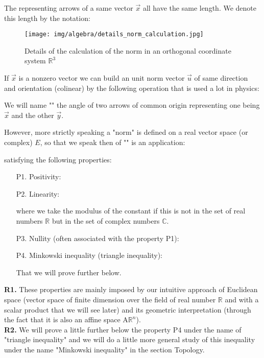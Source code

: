 	The representing arrows of a same vector $\vec{x}$ all have the same length. We denote this length by the notation:
	
	\begin{figure}[H]
		\centering
		\texttt{[image: img/algebra/details\_norm\_calculation.jpg]}
		\caption{Details of the calculation of the norm in an orthogonal coordinate system $\mathbb{R}^3$}
	\end{figure}
	If $\vec{x}$ is a nonzero vector we can build an unit norm vector $\vec{u}$ of same direction and orientation (colinear) by the following operation that is used a lot in physics:
	
	We will name "" the angle of two arrows of common origin representing one being $\vec{x}$ and the other $\vec{y}$.
	
	However, more strictly speaking a "norm" is defined on a real vector space (or complex) $E$, so that we speak then of "" is an application:
	
	satisfying the following properties:
	\begin{enumerate}
		\item[P1.] Positivity:
		
		\item[P2.] Linearity:
		
		where we take the modulus of the constant if this is not in the set of real numbers $\mathbb{R}$ but in the set of complex numbers $\mathbb{C}$.
		\item[P3.] Nullity (often associated with the property P1):
		
		\item[P4.] Minkowski inequality (triangle inequality):
		
		That we will prove further below.
	\end{enumerate}
	\begin{tcolorbox}[title=Remark,colframe=black,arc=10pt]
	\textbf{R1.} These properties are mainly imposed by our intuitive approach of Euclidean space (vector space of finite dimension over the field of real number $\mathbb{R}$ and with a scalar product that we will see later) and its geometric interpretation (through the fact that it is also an affine space $\text{A}\mathbb{R}^n$).\\
	
	\textbf{R2.} We will prove a little further below the property P4 under the name of "triangle inequality" and we will do a little more general study of this inequality under the name "Minkowski inequality" in the section Topology.
	\end{tcolorbox}	
	
